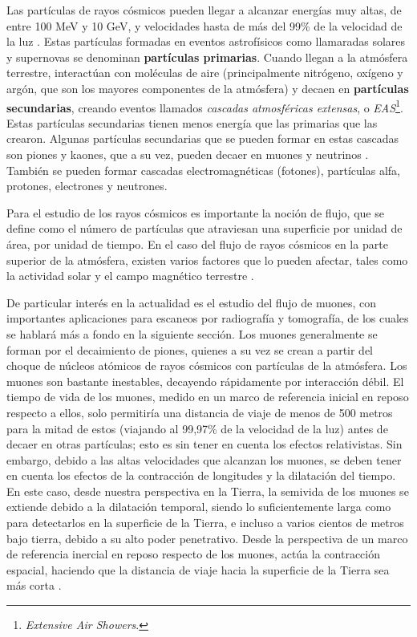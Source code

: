 \documentclass[12pt]{report}
\begin{document}
Las partículas de rayos cósmicos pueden llegar a alcanzar energías muy altas, de entre 100 MeV y 10 GeV, y velocidades hasta de más del 99\% de la velocidad de la luz \cite{moldwin2008introduction}. Estas partículas formadas en eventos astrofísicos como llamaradas solares y supernovas se denominan \textbf{partículas primarias}. Cuando llegan a la atmósfera terrestre, interactúan con moléculas de aire (principalmente nitrógeno, oxígeno y argón, que son los mayores componentes de la atmósfera) y decaen en \textbf{partículas secundarias}, creando eventos llamados \textit{cascadas atmosféricas extensas}, o \textit{EAS}\footnote{\textit{Extensive Air Showers}.}. Estas partículas secundarias tienen menos energía que las primarias que las crearon. Algunas partículas secundarias que se pueden formar en estas cascadas son piones y kaones, que a su vez, pueden decaer en muones y neutrinos \cite{grieder2010extensive}. También se pueden formar cascadas electromagnéticas (fotones), partículas alfa, protones, electrones y neutrones.

Para el estudio de los rayos cósmicos es importante la noción de flujo, que se define como el número de partículas que atraviesan una superficie por unidad de área, por unidad de tiempo. En el caso del flujo de rayos cósmicos en la parte superior de la atmósfera, existen varios factores que lo pueden afectar, tales como la actividad solar y el campo magnético terrestre \cite{PhysRevD.98.030001}.

De particular interés en la actualidad es el estudio del flujo de muones, con importantes aplicaciones para escaneos por radiografía y tomografía, de los cuales se hablará más a fondo en la siguiente sección. Los muones generalmente se forman por el decaimiento de piones, quienes a su vez se crean a partir del choque de núcleos atómicos de rayos cósmicos con partículas de la atmósfera. Los muones son bastante inestables, decayendo rápidamente por interacción débil. El tiempo de vida de los muones, medido en un marco de referencia inicial en reposo respecto a ellos, solo permitiría una distancia de viaje de menos de 500 metros para la mitad de estos (viajando al 99,97\% de la velocidad de la luz) antes de decaer en otras partículas; esto es sin tener en cuenta los efectos relativistas. Sin embargo, debido a las altas velocidades que alcanzan los muones, se deben tener en cuenta los efectos de la contracción de longitudes y la dilatación del tiempo. En este caso, desde nuestra perspectiva en la Tierra, la semivida de los muones se extiende debido a la dilatación temporal, siendo lo suficientemente larga como para detectarlos en la superficie de la Tierra, e incluso a varios cientos de metros bajo tierra, debido a su alto poder penetrativo. Desde la perspectiva de un marco de referencia inercial en reposo respecto de los muones, actúa la contracción espacial, haciendo que la distancia de viaje hacia la superficie de la Tierra sea más corta \cite{cunningham2019high}.
\end{document}
